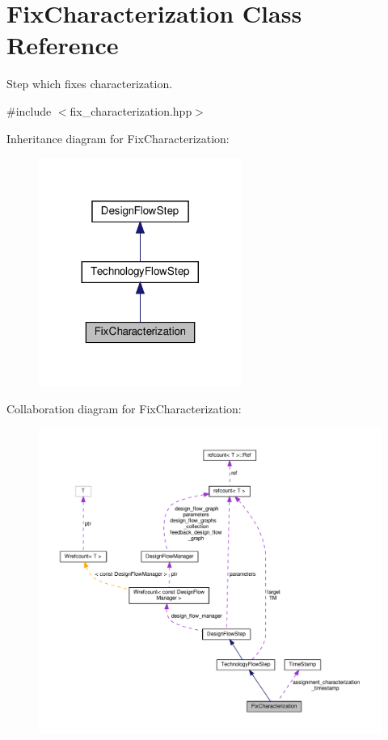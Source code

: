 \hypertarget{classFixCharacterization}{}\section{Fix\+Characterization Class Reference}
\label{classFixCharacterization}


Step which fixes characterization.  




{\ttfamily \#include $<$fix\+\_\+characterization.\+hpp$>$}



Inheritance diagram for Fix\+Characterization\+:
\nopagebreak
\begin{figure}[H]
\begin{center}
\leavevmode
\includegraphics[width=188pt]{dd/dfe/classFixCharacterization__inherit__graph}
\end{center}
\end{figure}


Collaboration diagram for Fix\+Characterization\+:
\nopagebreak
\begin{figure}[H]
\begin{center}
\leavevmode
\includegraphics[width=350pt]{dc/d3d/classFixCharacterization__coll__graph}
\end{center}
\end{figure}

